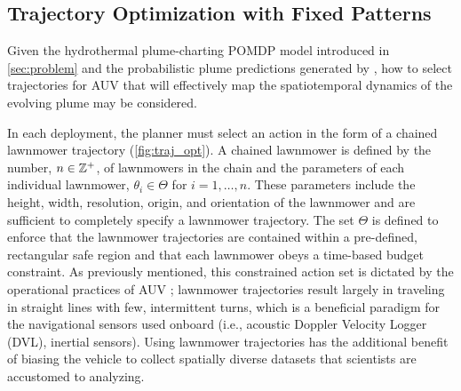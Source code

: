 \subsection{Trajectory Optimization with Fixed Patterns}
\label{sec:to}
Given the hydrothermal plume-charting POMDP model introduced in \cref{sec:problem} and the probabilistic plume predictions generated by \PHUMES, how to select trajectories for AUV \Sentry that will effectively map the spatiotemporal dynamics of the evolving plume may be considered. %

In each deployment, the planner must select an action in the form of a chained lawnmower trajectory (\cref{fig:traj_opt}). A chained lawnmower is defined by the number, $n \in \mathbb{Z}^+$, of lawnmowers in the chain and the parameters of each individual lawnmower, $\theta_i \in \Theta$ for $i = 1, \dots, n$. These parameters include the height, width, resolution, origin, and orientation of the lawnmower and are sufficient to completely specify a lawnmower trajectory. The set $\Theta$ is defined to enforce that the lawnmower trajectories are contained within a pre-defined, rectangular safe region and that each lawnmower obeys a time-based budget constraint. As previously mentioned, this constrained action set is dictated by the operational practices of AUV \Sentry; lawnmower trajectories result largely in \Sentry traveling in straight lines with few, intermittent turns, which is a beneficial paradigm for the navigational sensors used onboard (i.e., acoustic Doppler Velocity Logger (DVL), inertial sensors). Using lawnmower trajectories has the additional benefit of biasing the vehicle to collect spatially diverse datasets that scientists are accustomed to analyzing. 

